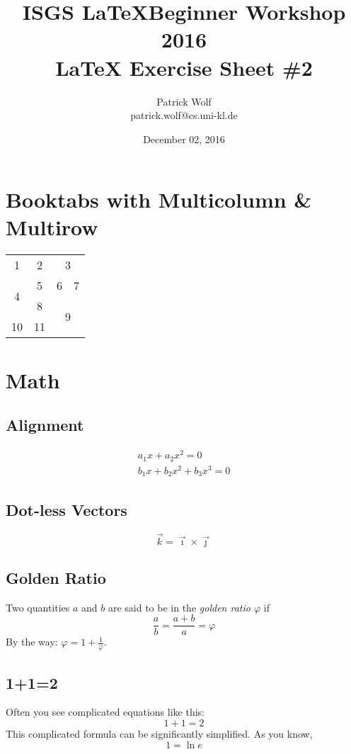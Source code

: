 \documentclass[a4paper,11pt]{article}
\title{ISGS \LaTeX Beginner Workshop 2016\\
\LaTeX{} Exercise Sheet \#2}
\author{
Patrick Wolf \\ patrick.wolf@cs.uni-kl.de}
\date{December 02, 2016}
\begin{document}
\maketitle

\tableofcontents

\section{Booktabs with Multicolumn \& Multirow}
\begin{tabular}{cccc}
\toprule
1&2&\multicolumn{2}{c}{3}\\
\multirow{2}{*}{4}&5&6&7\\
&8& \multicolumn{2}{c}{\multirow{2}{*}{9}}\\
10&11&&\\
\bottomrule
\end{tabular}

\section{Math}
\subsection{Alignment}
\begin{align}	%
	a_{1} x  + a_{2} x^{2} = 0\\
	b_{1} x + b_{2} x^{2} + b_{3} x ^{3} =0
\end{align}

\subsection{Dot-less Vectors}
\begin{equation*}
	\vec{k} = \vec{\imath} \times \vec{\jmath}
\end{equation*}

\subsection{Golden Ratio}	%
Two quantities $a$ and $b$ are said to be in the \emph{golden ratio $\varphi$} if
\begin{equation}
\frac{a}{b} = \frac{a+b}{a} = \varphi
\end{equation}
By the way: $\varphi = 1+\frac{1}{\varphi}$.


\subsection{1+1=2}
Often you see complicated equations like this:
\begin{equation} \label{eq:1+1}
1 + 1 = 2
\end{equation}
This complicated formula can be significantly simplified. As you know,
\begin{equation} \label{eq:ln}
1 = \ln e
\end{equation}
\end{document}
